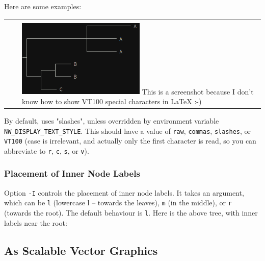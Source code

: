 \noindent{}Here are some examples:

\begin{center}
{\footnotesize
\begin{tabular}{p{}p{}p{}}


& &


\\


& &

\includegraphics[width=0.5\textwidth]{display_24_txt.png}
This is a screenshot because I don't know how to show VT100 special characters in \LaTeX{} :-)
\end{tabular}
}
\end{center}

\noindent{}By default, \display{} uses "slashes", unless overridden by
environment variable \texttt{NW\_DISPLAY\_TEXT\_STYLE}. This should have a
value of \texttt{raw}, \texttt{commas}, \texttt{slashes}, or \texttt{VT100}
(case is irrelevant, and actually only the first character is read, so you can
abbreviate to \texttt{r}, \texttt{c}, \texttt{s}, or \texttt{v}).

\subsubsection{Placement of Inner Node Labels}

Option \texttt{-I} controls the placement of inner node labels. It takes an
argument, which can be \texttt{l} (lowercase l -- towards the leaves),
\texttt{m} (in the middle), or \texttt{r} (towards the root). The default
behaviour is \texttt{l}.  Here is the above tree, with inner labels near the
root:


\begin{samepage}

\end{samepage}

\subsection[As SVG]{As Scalable Vector Graphics}
\label{sct_display_svg}

